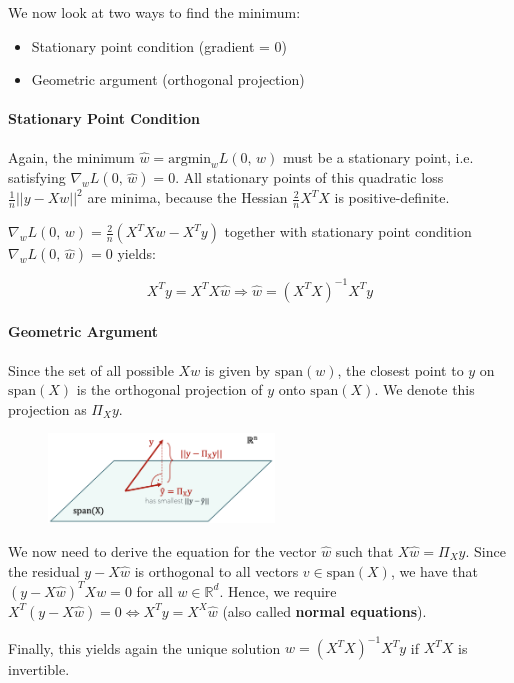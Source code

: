 \documentclass[a4paper]{extarticle}
\begin{document}
We now look at two ways to find the minimum:

\begin{itemize}
	\item Stationary point condition (gradient = \(0\))
	\item Geometric argument (orthogonal projection)
\end{itemize}

\paragraph{Stationary Point Condition}

Again, the minimum \(\hat{w} = \text{argmin}_w L(0, \, w)\) must be a stationary point, i.e. satisfying \(\nabla_w L(0, \, \hat{w}) = 0\). All stationary points of this quadratic loss \(\frac{1}{n}||y-Xw||^2\) are minima, because the Hessian \(\frac{2}{n}X^TX\) is positive-definite.

\(\nabla_w L(0, \, w) = \frac{2}{n}(X^TXw - X^Ty)\) together with stationary point condition \(\nabla_w L(0, \, \hat{w}) = 0\) yields:

\begin{tbox}
	\[
		X^Ty = X^TX\hat{w} \Rightarrow \hat{w} = (X^TX)^{-1}X^Ty
	\]
\end{tbox}

\paragraph{Geometric Argument}

Since the set of all possible \(Xw\) is given by \(\text{span}(w)\), the closest point to \(y\) on \(\text{span}(X)\) is the orthogonal projection of \(y\) onto \(\text{span}(X)\). We denote this projection as \(\Pi_Xy\).

\begin{figure}[H]
	\includegraphics[width = 6cm]{../images/IntroML_Fig1-8}
	\centering
\end{figure}

We now need to derive the equation for the vector \(\hat{w}\) such that \(X\hat{w} = \Pi_Xy\). Since the residual \(y - X\hat{w}\) is orthogonal to all vectors \(v \in \text{span}(X)\), we have that \((y - X\hat{w})^TXw = 0\) for all \(w \in \mathbb{R}^d\). Hence, we require \(X^T(y-X\hat{w}) = 0 \Leftrightarrow X^Ty = X^X\hat{w}\) (also called \textbf{normal equations}).

Finally, this yields again the unique solution \(\hat{w} = (X^TX)^{-1}X^Ty\) if \(X^TX\) is invertible.
\end{document}
